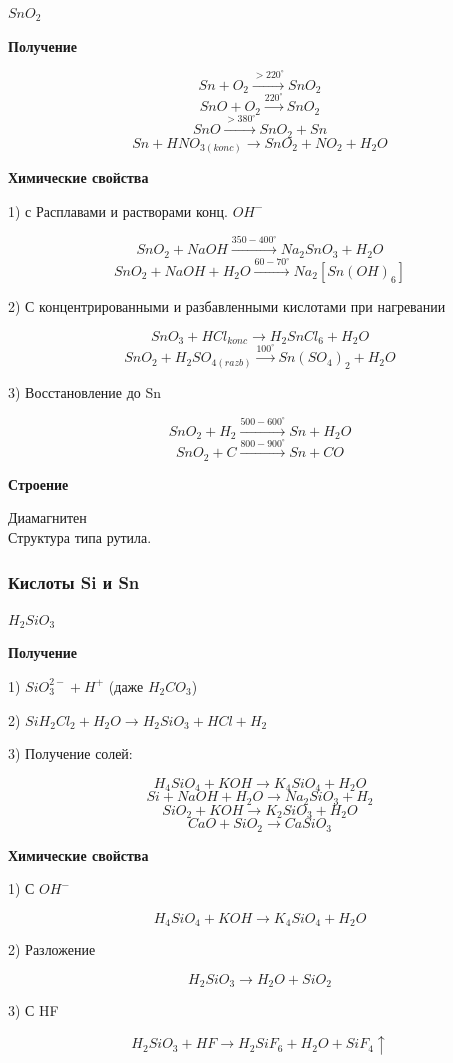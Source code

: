 $SnO_2$

\textbf{Получение}

$$Sn + O_2 \xrightarrow{>220^{\circ}} SnO_2$$
$$SnO + O_2 \xrightarrow{220^{\circ}} SnO_2$$
$$SnO \xrightarrow{>380^{\circ}} SnO_2 + Sn$$
$$Sn + HNO_{3(konc)}\rightarrow SnO_2 + NO_2 + H_2O$$

\textbf{Химические свойства}

1) с Расплавами и  растворами конц. $OH^-$

$$SnO_2 + NaOH \xrightarrow{350-400^{\circ}} Na_2SnO_3 + H_2O$$
$$SnO_2 + NaOH + H_2O\xrightarrow{60-70^{\circ}} Na_2[Sn(OH)_6]$$

2) С концентрированными и разбавленными кислотами при нагревании

$$SnO_3 + HCl_{konc} \rightarrow H_2SnCl_6 + H_2O$$
$$SnO_2 + H_2SO_{4(razb)} \xrightarrow{100^{\circ}} Sn(SO_4)_2 + H_2O$$

3) Восстановление до Sn

$$SnO_2 + H_2 \xrightarrow{500-600^{\circ}} Sn + H_2O$$
$$SnO_2 + C \xrightarrow{800-900^{\circ}} Sn + CO$$

\textbf{Строение}

Диамагнитен\\
Структура типа рутила.

\subsubsection*{Кислоты Si и Sn}

$H_2SiO_3$

\textbf{Получение}

1) $SiO_3^{2-} + H^+$ (даже $H_2CO_3$)

2) $SiH_2Cl_2 + H_2O \rightarrow H_2SiO_3 + HCl + H_2$

3) Получение солей:

$$H_4SiO_4 + KOH \rightarrow K_4SiO_4 + H_2O$$
$$Si + NaOH + H_2O \rightarrow Na_2SiO_3 + H_2$$
$$SiO_2 + KOH \rightarrow K_2SiO_3 + H_2O$$
$$CaO + SiO_2 \rightarrow CaSiO_3$$

\textbf{Химические свойства}

1) С $OH^-$

$$H_4SiO_4 + KOH \rightarrow K_4SiO_4 + H_2O$$

2) Разложение 

$$H_2SiO_3 \rightarrow H_2O + SiO_2$$

3) С HF

$$H_2SiO_3 + HF \rightarrow H_2SiF_6 + H_2O + SiF_4\uparrow$$


